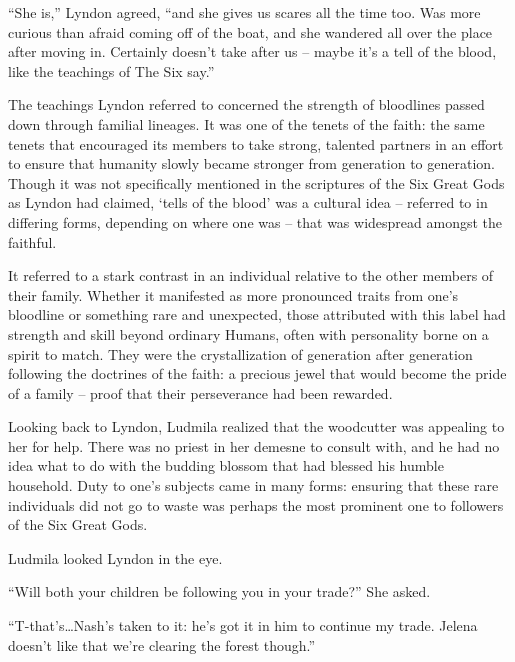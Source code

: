  

“She is,” Lyndon agreed, “and she gives us scares all the time too. Was more curious than afraid coming off of the boat, and she wandered all over the place after moving in. Certainly doesn’t take after us – maybe it’s a tell of the blood, like the teachings of The Six say.”

 

The teachings Lyndon referred to concerned the strength of bloodlines passed down through familial lineages. It was one of the tenets of the faith: the same tenets that encouraged its members to take strong, talented partners in an effort to ensure that humanity slowly became stronger from generation to generation. Though it was not specifically mentioned in the scriptures of the Six Great Gods as Lyndon had claimed, ‘tells of the blood’ was a cultural idea – referred to in differing forms, depending on where one was – that was widespread amongst the faithful.

 

It referred to a stark contrast in an individual relative to the other members of their family. Whether it manifested as more pronounced traits from one’s bloodline or something rare and unexpected, those attributed with this label had strength and skill beyond ordinary Humans, often with personality borne on a spirit to match. They were the crystallization of generation after generation following the doctrines of the faith: a precious jewel that would become the pride of a family – proof that their perseverance had been rewarded.

 

Looking back to Lyndon, Ludmila realized that the woodcutter was appealing to her for help. There was no priest in her demesne to consult with, and he had no idea what to do with the budding blossom that had blessed his humble household. Duty to one’s subjects came in many forms: ensuring that these rare individuals did not go to waste was perhaps the most prominent one to followers of the Six Great Gods.

 

Ludmila looked Lyndon in the eye.

 

“Will both your children be following you in your trade?” She asked.

 

“T-that’s…Nash’s taken to it: he’s got it in him to continue my trade. Jelena doesn’t like that we’re clearing the forest though.”

